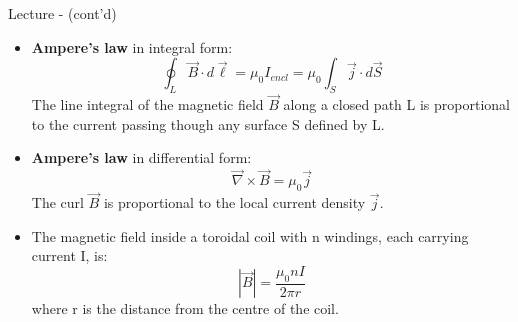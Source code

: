\begin{frame}{Lecture \summarizedlecture - \lecturesummarytitle (cont'd)}

\begin{itemize}

\item
    {\bf Ampere's law} in integral form:
     \begin{equation*}
        \oint_{L} \vec{B} \cdot d\vec{\ell} = \mu_0 I_{encl} = \mu_0 \int_{S} \vec{j} \cdot d\vec{S}
     \end{equation*}
     The line integral of the magnetic field $\vec{B}$ along a closed path L is proportional to the
     current passing though any surface S defined by L.

\vspace{0.2cm}

\item
    {\bf Ampere's law} in differential form:
    \begin{equation*}
       \vec{\nabla} \times \vec{B} = \mu_0 \vec{j}
    \end{equation*}
    The curl $\vec{B}$ is proportional to the local current density $\vec{j}$.

\vspace{0.2cm}

\item
    The magnetic field inside a toroidal coil with n windings, each carrying current I, is:
     \begin{equation*}
          |\vec{B}| = \frac{\mu_0 n I}{2\pi r}
     \end{equation*}
     where r is the distance from the centre of the coil.

\end{itemize}

\end{frame}

%
%
%

